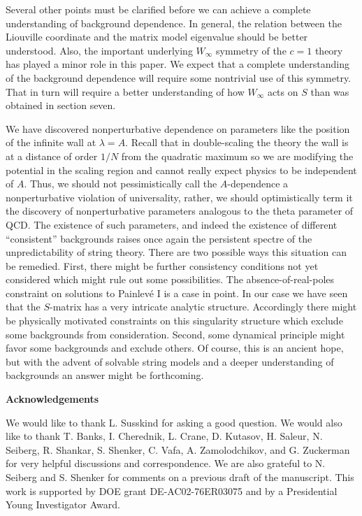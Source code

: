  
Several other points must be clarified before we can achieve a
complete understanding of background dependence.
In general, the relation between 
the Liouville coordinate and the matrix model eigenvalue should be
better understood. Also, the important underlying $W_\infty$ symmetry 
of the $c=1$ theory has played a minor role in this paper. 
We expect that a complete understanding of the background 
dependence will require some nontrivial use of this symmetry. 
That in turn will require a better understanding of how $W_\infty$ acts 
on $S$ than was obtained in section seven. 
 
We have discovered nonperturbative dependence on parameters 
like the position of the infinite wall at $\lambda = A$. 
Recall that in double-scaling the theory the wall is 
at a distance of order $1/N$ from the quadratic maximum so we 
are modifying the potential in the scaling region and cannot really 
expect physics to be independent of $A$. Thus, we should 
not pessimistically call the $A$-dependence a nonperturbative 
violation of universality, rather, we should optimistically term 
it the discovery of nonperturbative parameters analogous to 
the theta parameter of QCD.%
The existence of such parameters, and indeed the existence
of different ``consistent'' backgrounds raises once again
the persistent spectre of the unpredictability of string theory. 
There are two possible ways this situation can be remedied. 
First, there might be further consistency conditions 
not yet considered which might rule out some
possibilities. The absence-of-real-poles constraint on 
solutions to Painlev\'e I is a case in point.
In our case we have seen that the $S$-matrix has a very 
intricate analytic structure. Accordingly there might be physically
motivated constraints on this singularity structure which 
exclude some backgrounds from consideration. Second, 
some dynamical principle might favor some backgrounds
and exclude others. Of course, this is an ancient hope, 
but with the advent of solvable string models and a deeper
understanding of backgrounds an answer might be forthcoming.
 
\bigskip
\centerline{\bf Acknowledgements}
 
We would like to thank L. Susskind for asking a good question. 
We would also like to thank
T. Banks, I. Cherednik, L. Crane, D. Kutasov, H. Saleur, 
N. Seiberg, R. Shankar, S. Shenker,  C. Vafa, 
A. Zamolodchikov, and G. Zuckerman for very helpful discussions and 
correspondence. We are also grateful to N. Seiberg and S. Shenker for
comments on a previous draft of the manuscript. 
This work is supported by DOE grant DE-AC02-76ER03075
and by a Presidential Young Investigator Award. 
 
